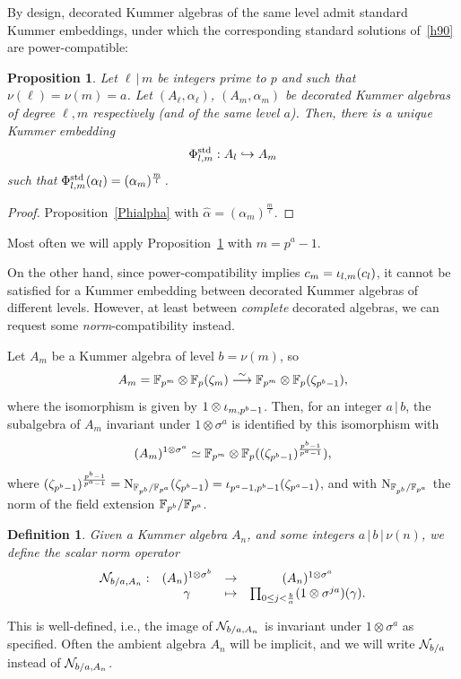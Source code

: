 \documentclass[sigconf]{acmart}
\newtheorem{proposition}[theorem]{Proposition}
\newtheorem{definition}[theorem]{Definition}
\begin{document}
By design, decorated Kummer algebras of the same level admit standard Kummer embeddings,
under which the corresponding standard solutions of~\eqref{h90} are power-compatible:
\begin{proposition}
\label{embedincomplete}
Let $\ell\,|\,m$ be integers prime to $p$ and such that $\nu(\ell)=\nu(m)=a$.
Let $(A_\ell,\alpha_\ell)$, $(A_m,\alpha_m)$ be decorated Kummer algebras
of degree $\ell,m$ respectively (and of the same level $a$).
Then, there is a unique Kummer embedding
\[ {\Phi^{\mathrm{std}}_{{l},{m}}}:A_l\hookrightarrow A_m \]
such that ${\Phi^{\mathrm{std}}_{{l},{m}}}(\alpha_l)=(\alpha_m)^{\frac{m}{l}}$.
\end{proposition}
\begin{proof}
Proposition~\ref{Phialpha} with $\hat{\alpha}=(\alpha_m)^{\frac{m}{\ell}}$.
\end{proof}
Most often we will apply Proposition~\ref{embedincomplete} with $m=p^a-1$.

On the other hand, 
since power-compatibility implies $c_m={\iota_{{l},{m}}}(c_l)$,
it cannot be satisfied for a Kummer embedding
between decorated Kummer algebras of different levels.
However, at least between \emph{complete} decorated algebras, we can request some \emph{norm}-compatibility
instead.

Let $A_m$ be a Kummer algebra of level $b=\nu(m)$, so
\[ A_m=\mathbb{F}_{p^m}\otimes\mathbb{F}_{p}(\zeta_m)\overset{\sim}{\longrightarrow}\mathbb{F}_{p^m}\otimes\mathbb{F}_{p}(\zeta_{p^b-1}), \]
where the isomorphism is given by $1\otimes{\iota_{{m},{p^b-1}}}$.
Then, for an integer $a\,|\,b$,
the subalgebra of $A_m$ invariant under $1\otimes\sigma^a$ is identified
by this isomorphism with
\[ (A_m)^{1\otimes\sigma^a}\simeq\mathbb{F}_{p^m}\otimes\mathbb{F}_{p}((\zeta_{p^b-1})^{\frac{p^b-1}{p^a-1}}), \]
where
$(\zeta_{p^b-1})^{\frac{p^b-1}{p^a-1}}=\operatorname{N}_{\mathbb{F}_{p^b}/\mathbb{F}_{p^a}}(\zeta_{p^b-1})={\iota_{{p^a-1},{p^b-1}}}(\zeta_{p^a-1})$,
and with $\operatorname{N}_{\mathbb{F}_{p^b}/\mathbb{F}_{p^a}}$ the norm of the field extension
$\mathbb{F}_{p^b}/\mathbb{F}_{p^a}$.

\begin{definition}
\label{def:norm}
Given a Kummer algebra $A_n$, and some integers $a\,|\,b\,|\,\nu(n)$, we define
the \emph{scalar norm} operator
\[
\begin{array}{cccc}
  \mathcal{N}_{b/a,A_n}: & (A_n)^{1\otimes\sigma^b} & \to & (A_n)^{1\otimes\sigma^a} \\
  & \gamma & \mapsto & \prod_{0\leq j<\frac{b}{a}} (1 \otimes \sigma^{ja})(\gamma).
\end{array}
\]
\end{definition}
This is well-defined, i.e., the image of $\mathcal{N}_{b/a,A_n}$ is invariant under $1\otimes\sigma^a$ as specified.
Often the ambient algebra $A_n$ will be implicit,
and we will write $\mathcal{N}_{b/a}$ instead of $\mathcal{N}_{b/a,A_n}$.
\end{document}
